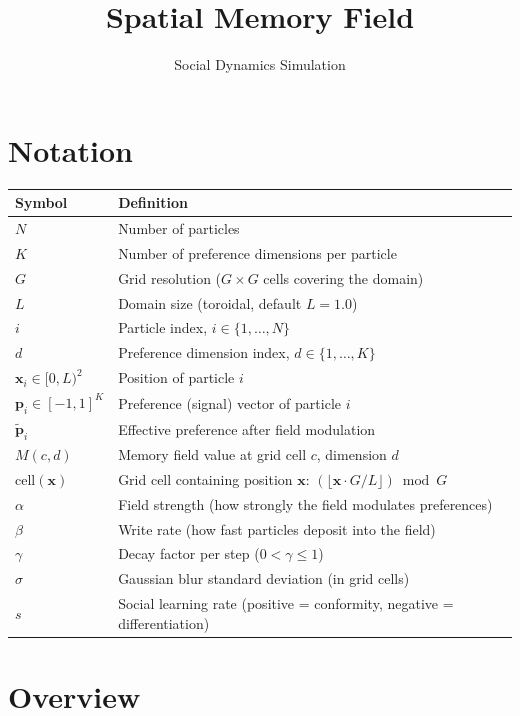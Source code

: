 \documentclass[11pt,a4paper]{article}
\title{Spatial Memory Field}
\author{Social Dynamics Simulation}
\date{}
\begin{document}
\maketitle

\section{Notation}

\begin{tabular}{ll}
\toprule
\textbf{Symbol} & \textbf{Definition} \\
\midrule
$N$ & Number of particles \\
$K$ & Number of preference dimensions per particle \\
$G$ & Grid resolution ($G \times G$ cells covering the domain) \\
$L$ & Domain size (toroidal, default $L = 1.0$) \\
$i$ & Particle index, $i \in \{1, \ldots, N\}$ \\
$d$ & Preference dimension index, $d \in \{1, \ldots, K\}$ \\
$\mathbf{x}_i \in [0, L)^2$ & Position of particle $i$ \\
$\mathbf{p}_i \in [-1, 1]^K$ & Preference (signal) vector of particle $i$ \\
$\tilde{\mathbf{p}}_i$ & Effective preference after field modulation \\
$M(c, d)$ & Memory field value at grid cell $c$, dimension $d$ \\
$\mathrm{cell}(\mathbf{x})$ & Grid cell containing position $\mathbf{x}$: $\left(\lfloor \mathbf{x} \cdot G/L \rfloor\right) \bmod G$ \\
$\alpha$ & Field strength (how strongly the field modulates preferences) \\
$\beta$ & Write rate (how fast particles deposit into the field) \\
$\gamma$ & Decay factor per step ($0 < \gamma \leq 1$) \\
$\sigma$ & Gaussian blur standard deviation (in grid cells) \\
$s$ & Social learning rate (positive = conformity, negative = differentiation) \\
\bottomrule
\end{tabular}

\section{Overview}
\end{document}
